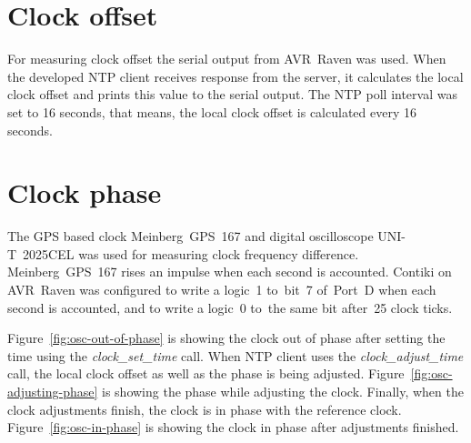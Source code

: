 \section{Clock offset}
For measuring clock offset the serial output from AVR~Raven was used.
When the developed NTP client receives response from the server,
it calculates the local clock offset and prints this value to the serial output.
The NTP poll interval was set to 16 seconds, that means, the local clock offset
is calculated every 16 seconds.

\section{Clock phase}
The GPS based clock Meinberg~GPS~167 and digital oscilloscope UNI-T~2025CEL
was used for measuring clock frequency difference.
Meinberg~GPS~167 rises an impulse when each second is accounted.
Contiki on AVR~Raven was configured to write a logic~1
to~bit~7 of~Port~D when each second is accounted,
and to write a logic~0 to~the same bit after~25 clock ticks.

Figure~\ref{fig:osc-out-of-phase} is showing the clock out of phase
after setting the time using the {\it{clock\_set\_time}} call.
When NTP client uses the {\it{clock\_adjust\_time}} call,
the local clock offset as well as the phase is being adjusted.
Figure~\ref{fig:osc-adjusting-phase} is showing the phase while adjusting the clock.
Finally, when the clock adjustments finish, the clock is in phase with
the reference clock. Figure~\ref{fig:osc-in-phase} is showing the clock in phase after adjustments finished.
